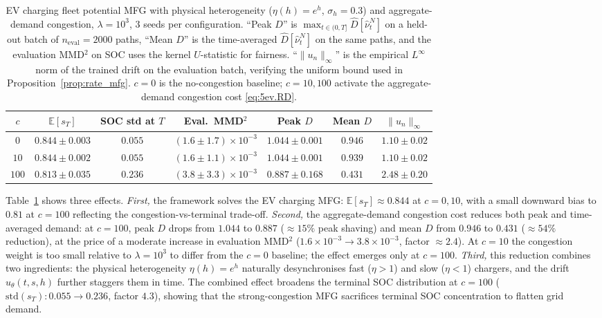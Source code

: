 \documentclass[11pt,leqno]{article}
\theoremstyle{plain}
\theoremstyle{remark}
\theoremstyle{definition}
\numberwithin{equation}{section}
\numberwithin{figure}{section}
\numberwithin{table}{section}
\numberwithin{algorithm}{section}
\newcommand{\EE}{\mathbb{E}}
\begin{document}
\begin{table}[htbp]
\centering
\caption{EV charging fleet potential MFG with physical heterogeneity ($\eta(h)=e^h$, $\sigma_h=0.3$)
and aggregate-demand congestion, $\lambda=10^3$, $3$ seeds per configuration.
``Peak $D$'' is $\max_{t\in(0,T]}\hat D[\hat\nu^N_t]$ on a held-out batch of $n_{\mathrm{eval}}=2000$ paths,
``Mean $D$'' is the time-averaged $\hat D[\hat\nu^N_t]$ on the same paths,
and the evaluation MMD${}^2$ on SOC uses the kernel $U$-statistic for fairness.
``$\|u_n\|_\infty$'' is the empirical $L^\infty$ norm of the trained drift on the evaluation batch,
verifying the uniform bound used in Proposition~\ref{prop:rate_mfg}.
$c=0$ is the no-congestion baseline; $c=10,100$ activate the aggregate-demand congestion cost \eqref{eq:5ev.RD}.}
\label{tab:ev_charging}
\begin{small}
\begin{tabular}{ccccccc}
\toprule
$c$ & $\EE[s_T]$ & SOC std at $T$ & Eval.\ MMD${}^2$ & Peak $D$ & Mean $D$ & $\|u_n\|_\infty$ \\
\midrule
$0$   & $0.844\pm 0.003$ & $0.055$ & $(1.6\pm 1.7)\times 10^{-3}$ & $1.044\pm 0.001$ & $0.946$ & $1.10\pm 0.02$ \\
$10$  & $0.844\pm 0.002$ & $0.055$ & $(1.6\pm 1.1)\times 10^{-3}$ & $1.044\pm 0.001$ & $0.939$ & $1.10\pm 0.02$ \\
$100$ & $0.813\pm 0.035$ & $\mathbf{0.236}$ & $(3.8\pm 3.3)\times 10^{-3}$ & $\mathbf{0.887\pm 0.168}$ & $\mathbf{0.431}$ & $2.48\pm 0.20$ \\
\bottomrule
\end{tabular}
\end{small}
\end{table}

Table~\ref{tab:ev_charging} shows three effects.
\emph{First,} the framework solves the EV charging MFG:
$\EE[s_T]\approx 0.844$ at $c=0,10$, with a small downward bias to $0.81$ at $c=100$
reflecting the congestion-vs-terminal trade-off.
\emph{Second,} the aggregate-demand congestion cost reduces both peak and time-averaged demand:
at $c=100$, peak $D$ drops from $1.044$ to $0.887$ ($\approx 15\%$ peak shaving)
and mean $D$ from $0.946$ to $\mathbf{0.431}$ ($\approx 54\%$ reduction),
at the price of a moderate increase in evaluation MMD${}^2$
($1.6\times 10^{-3}\to 3.8\times 10^{-3}$, factor $\approx 2.4$).
At $c=10$ the congestion weight is too small relative to $\lambda=10^3$ to differ from the $c=0$ baseline;
the effect emerges only at $c=100$.
\emph{Third,} this reduction combines two ingredients: the physical heterogeneity $\eta(h)=e^h$
naturally desynchronises fast ($\eta>1$) and slow ($\eta<1$) chargers, and the drift $u_\theta(t,s,h)$ further staggers them in time.
The combined effect broadens the terminal SOC distribution at $c=100$
($\mathrm{std}(s_T):0.055\to\mathbf{0.236}$, factor $4.3$),
showing that the strong-congestion MFG sacrifices terminal SOC concentration to flatten grid demand.
\end{document}

